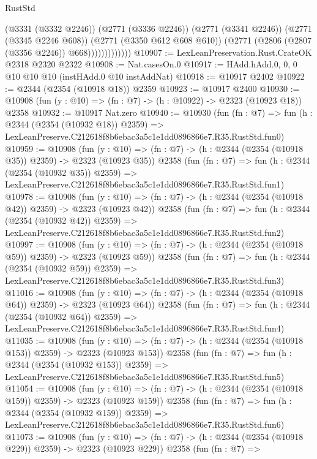 \begin{lexlean}{RustStd}
\begin{coremodule}
                          (@3331 (@3332 @2246))
                          (@2771 (@3336 @2246))
                          (@2771 (@3341 @2246))
                          (@2771 (@3345 @2246 @608))
                          (@2771 (@3350 @612 @608 @610))
                          (@2771 (@2806 (@2807 (@3356 @2246)) @668)))))))))))))
@10907 := LexLeanPreservation.Rust.CrateOK @2318 @2320 @2322
@10908 := Nat.casesOn.{0}
@10917 := HAdd.hAdd.{0, 0, 0} @10 @10 @10 (instHAdd.{0} @10 instAddNat)
@10918 := @10917 @2402
@10922 := @2344 (@2354 (@10918 @18)) @2359
@10923 := @10917 @2400
@10930 := @10908 (fun (y : @10) => (fn : @7) -> (h : @10922) -> @2323 (@10923 @18)) @2358
@10932 := @10917 Nat.zero
@10940 := @10930
    (fun (fn : @7) =>
    fun (h : @2344 (@2354 (@10932 @18)) @2359) =>
    LexLeanPreserve.C212618f8b6ebac3a5c1e1dd0896866e7.R35.RustStd.fun0)
@10959 := @10908
    (fun (y : @10) => (fn : @7) -> (h : @2344 (@2354 (@10918 @35)) @2359) -> @2323 (@10923 @35))
    @2358
    (fun (fn : @7) =>
    fun (h : @2344 (@2354 (@10932 @35)) @2359) =>
    LexLeanPreserve.C212618f8b6ebac3a5c1e1dd0896866e7.R35.RustStd.fun1)
@10978 := @10908
    (fun (y : @10) => (fn : @7) -> (h : @2344 (@2354 (@10918 @42)) @2359) -> @2323 (@10923 @42))
    @2358
    (fun (fn : @7) =>
    fun (h : @2344 (@2354 (@10932 @42)) @2359) =>
    LexLeanPreserve.C212618f8b6ebac3a5c1e1dd0896866e7.R35.RustStd.fun2)
@10997 := @10908
    (fun (y : @10) => (fn : @7) -> (h : @2344 (@2354 (@10918 @59)) @2359) -> @2323 (@10923 @59))
    @2358
    (fun (fn : @7) =>
    fun (h : @2344 (@2354 (@10932 @59)) @2359) =>
    LexLeanPreserve.C212618f8b6ebac3a5c1e1dd0896866e7.R35.RustStd.fun3)
@11016 := @10908
    (fun (y : @10) => (fn : @7) -> (h : @2344 (@2354 (@10918 @64)) @2359) -> @2323 (@10923 @64))
    @2358
    (fun (fn : @7) =>
    fun (h : @2344 (@2354 (@10932 @64)) @2359) =>
    LexLeanPreserve.C212618f8b6ebac3a5c1e1dd0896866e7.R35.RustStd.fun4)
@11035 := @10908
    (fun (y : @10) => (fn : @7) -> (h : @2344 (@2354 (@10918 @153)) @2359) -> @2323 (@10923 @153))
    @2358
    (fun (fn : @7) =>
    fun (h : @2344 (@2354 (@10932 @153)) @2359) =>
    LexLeanPreserve.C212618f8b6ebac3a5c1e1dd0896866e7.R35.RustStd.fun5)
@11054 := @10908
    (fun (y : @10) => (fn : @7) -> (h : @2344 (@2354 (@10918 @159)) @2359) -> @2323 (@10923 @159))
    @2358
    (fun (fn : @7) =>
    fun (h : @2344 (@2354 (@10932 @159)) @2359) =>
    LexLeanPreserve.C212618f8b6ebac3a5c1e1dd0896866e7.R35.RustStd.fun6)
@11073 := @10908
    (fun (y : @10) => (fn : @7) -> (h : @2344 (@2354 (@10918 @229)) @2359) -> @2323 (@10923 @229))
    @2358
    (fun (fn : @7) =>

\end{coremodule}
\end{lexlean}
